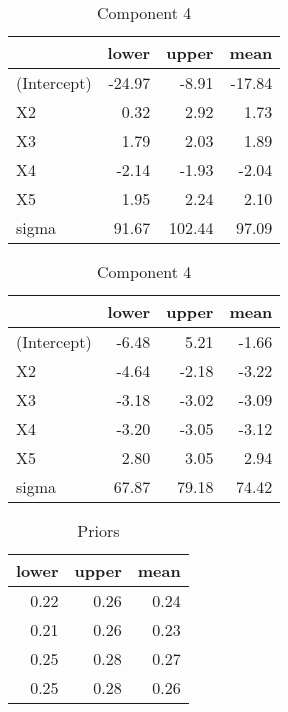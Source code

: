 \documentclass[10pt]{olplainarticle}\usepackage[]{graphicx}\usepackage[]{color}
\begin{document}
\begin{table}[!htb]
    \begin{minipage}{.5\linewidth}
      \caption{Component 3} \label{t3}
      \centering 
\begin{tabular}{lrrr}
\toprule
  & lower & upper & mean\\
\midrule
(Intercept) & -24.97 & -8.91 & -17.84\\
X2 & 0.32 & 2.92 & 1.73\\
X3 & 1.79 & 2.03 & 1.89\\
X4 & -2.14 & -1.93 & -2.04\\
X5 & 1.95 & 2.24 & 2.10\\
\addlinespace
sigma & 91.67 & 102.44 & 97.09\\
\bottomrule
\end{tabular} \end{minipage}%
    \begin{minipage}{0.7\linewidth}
      \centering
        \caption{Component 4} \label{t4} 
\begin{tabular}{lrrr}
\toprule
  & lower & upper & mean\\
\midrule
(Intercept) & -6.48 & 5.21 & -1.66\\
X2 & -4.64 & -2.18 & -3.22\\
X3 & -3.18 & -3.02 & -3.09\\
X4 & -3.20 & -3.05 & -3.12\\
X5 & 2.80 & 3.05 & 2.94\\
\addlinespace
sigma & 67.87 & 79.18 & 74.42\\
\bottomrule
\end{tabular} \end{minipage} 
\end{table}\begin{table}[!htb]
    \centering
    \begin{minipage}{.5\linewidth}
      \caption{Priors} \label{t5}
      \centering 
\begin{tabular}{rrr}
\toprule
lower & upper & mean\\
\midrule
0.22 & 0.26 & 0.24\\
0.21 & 0.26 & 0.23\\
0.25 & 0.28 & 0.27\\
0.25 & 0.28 & 0.26\\
\bottomrule
\end{tabular} \end{minipage}%
\end{table}




\end{document}
